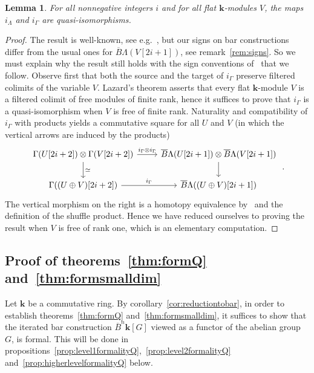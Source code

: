 \documentclass{amsart}
\newtheorem{lemma}[formula]{Lemma}
\theoremstyle{definition}
\theoremstyle{remark}
\def\k{\mathbf{k}}
\begin{document}
\begin{lemma}\label{lm:formalitySLambda}
	For all nonnegative integers $i$ and for all flat $\k$-modules $V$, the maps $i_\Lambda$ and $i_\Gamma$ are quasi-isomorphisms.
\end{lemma}
\begin{proof}
	The result is well-known, see e.g.~\cite[Chapter~3, Ex.~3.2.5]{lv-12}, but our signs on bar constructions differ from the usual ones for $\overline{B}\Lambda(V[2i+1])$, see remark~\ref{rem:signs}. So we must explain why the result still holds with the sign conventions of~\cite{gu-ma-74} that we follow. Observe first that both the source and the target of $i_{\Gamma}$ preserve filtered colimits of the variable $V$. Lazard's theorem asserts that every flat $\k$-module $V$ is a filtered colimit of free modules of finite rank, hence it suffices to prove that $i_\Gamma$ is a quasi-isomorphism when $V$ is free of finite rank. Naturality and compatibility of $i_{\Gamma}$ with products yields a commutative square for all $U$ and $V$ (in which the vertical arrows are induced by the products)
	\[
	\begin{tikzcd}
		\Gamma(U[2i+2])\otimes \Gamma(V[2i+2])\ar{d}{\simeq}\ar{r}{i_{\Gamma}\otimes i_{\Gamma}}   &\overline{B}\Lambda(U[2i+1])\otimes \overline{B}\Lambda(V[2i+1])\ar{d}\\
		\Gamma((U\oplus V)[2i+2])\ar{r}{i_{\Gamma}}& \overline{B}\Lambda((U\oplus V)[2i+1])
	\end{tikzcd}\;.
	\]
	The vertical morphism on the right is a homotopy equivalence by~\cite[Proposition~A.3]{gu-ma-74} and the definition of the shuffle product. Hence we have reduced ourselves to proving the result when $V$ is free of rank one, which is an elementary computation.
\end{proof}
	
\subsection{Proof of theorems~\ref{thm:formQ} and~\ref{thm:formsmalldim}}
Let $\k$ be a commutative ring. By corollary~\ref{cor:reductiontobar}, in order to establish theorems~\ref{thm:formQ} and~\ref{thm:formsmalldim}, it suffices to show that the iterated bar construction $\overline{B}^n\k[G]$ viewed as a functor of the abelian group $G$, is formal.
This will be done in propositions~\ref{prop:level1formalityQ},~\ref{prop:level2formalityQ} and~\ref{prop:higherlevelformalityQ} below.
\end{document}
